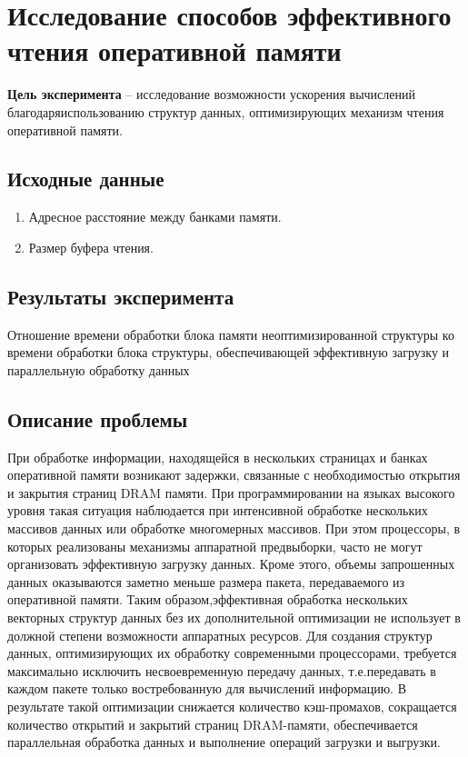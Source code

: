\section{Исследование способов эффективного  чтения оперативной памяти}

\textbf{Цель эксперимента} -- исследование возможности ускорения вычислений благодаряиспользованию структур данных, оптимизирующих механизм чтения оперативной памяти.

\subsection{Исходные данные}
\begin{enumerate}
	\item Адресное расстояние между банками памяти.
	\item Размер буфера чтения.
\end{enumerate}

\subsection{Результаты эксперимента}
Отношение   времени   обработки   блока   памяти неоптимизированной структуры ко времени обработки блока структуры, обеспечивающей эффективную загрузку и параллельную обработку данных


\subsection{Описание проблемы}
При   обработке информации, находящейся в нескольких страницах и банках оперативной памяти возникают задержки, связанные с необходимостью открытия и закрытия страниц DRAM памяти. При программировании на языках высокого уровня такая ситуация наблюдается при интенсивной обработке нескольких массивов данных   или   обработке   многомерных   массивов.   При   этом   процессоры,   в   которых реализованы   механизмы   аппаратной   предвыборки,   часто   не   могут   организовать эффективную загрузку данных. Кроме этого, объемы запрошенных данных оказываются заметно меньше размера пакета, передаваемого из оперативной памяти. Таким образом,эффективная обработка нескольких векторных структур данных без их дополнительной оптимизации не использует в должной степени возможности аппаратных ресурсов. Для создания структур данных, оптимизирующих их обработку   современными процессорами, требуется максимально исключить несвоевременную передачу данных, т.е.передавать в каждом пакете только востребованную для вычислений информацию. В результате   такой   оптимизации   снижается   количество   кэш-промахов,   сокращается количество открытий и закрытий страниц  DRAM-памяти, обеспечивается параллельная обработка данных и выполнение операций загрузки и выгрузки.

